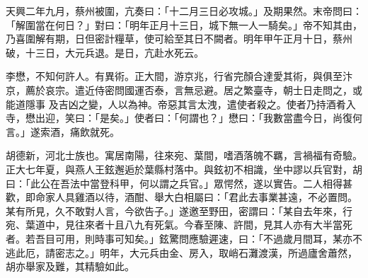 \begin{pinyinscope}
 天興二年九月，蔡州被圍，亢奏曰：「十二月三日必攻城。」及期果然。末帝問曰：「解圍當在何日？」對曰：「明年正月十三日，城下無一人一騎矣。」帝不知其由，乃喜圍解有期，日但密計糧草，使可給至其日不闕者。明年甲午正月十日，蔡州破，十三日，大元兵退。是日，亢赴水死云。



 李懋，不知何許人。有異術。正大間，游京兆，行省完顏合達愛其術，與俱至汴京，薦於哀宗。遣近侍密問國運否泰，言無忌避。居之繁臺寺，朝士日走問之，或能道隱事
 及吉凶之變，人以為神。帝惡其言太洩，遣使者殺之。使者乃持酒肴入寺，懋出迎，笑曰：「是矣。」使者曰：「何謂也？」懋曰：「我數當盡今日，尚復何言。」遂索酒，痛飲就死。



 胡德新，河北士族也。寓居南陽，往來宛、葉間，嗜酒落魄不羈，言禍福有奇驗。正大七年夏，與燕人王鉉邂逅於葉縣村落中。與鉉初不相識，坐中謬以兵官對，胡曰：「此公在吾法中當登科甲，何以謂之兵官。」眾愕然，遂以實告。二人相得甚歡，即命家人具雞酒以待，酒酣、舉大白相屬曰：「君此去事業甚遠，不必置問。某有所見，久不敢對人言，今欲告子。」遂邀至野田，密謂曰：「某自去年來，行
 宛、葉道中，見往來者十且八九有死氣。今春至陳、許間，見其人亦有大半當死者。若吾目可用，則時事可知矣。」鉉驚問應驗遲速，曰：「不過歲月間耳，某亦不逃此厄，請密志之。」明年，大元兵由金、房入，取峭石灘渡漢，所過廬舍蕭然，胡亦舉家及難，其精驗如此。



\end{pinyinscope}